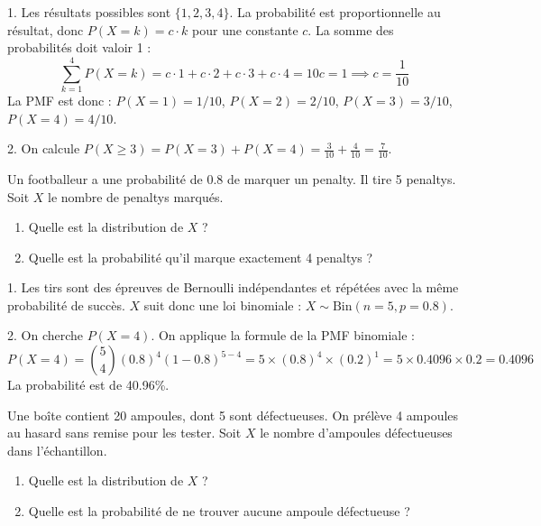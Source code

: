 \begin{correctionbox}
1. Les résultats possibles sont $\{1, 2, 3, 4\}$. La probabilité est proportionnelle au résultat, donc $P(X=k) = c \cdot k$ pour une constante $c$.
La somme des probabilités doit valoir 1 :
$$ \sum_{k=1}^{4} P(X=k) = c \cdot 1 + c \cdot 2 + c \cdot 3 + c \cdot 4 = 10c = 1 \implies c = \frac{1}{10} $$
La PMF est donc : $P(X=1)=1/10$, $P(X=2)=2/10$, $P(X=3)=3/10$, $P(X=4)=4/10$.

2. On calcule $P(X \ge 3) = P(X=3) + P(X=4) = \frac{3}{10} + \frac{4}{10} = \frac{7}{10}$.
\end{correctionbox}

\begin{exercicebox}
Un footballeur a une probabilité de $0.8$ de marquer un penalty. Il tire 5 penaltys. Soit $X$ le nombre de penaltys marqués.
\begin{enumerate}
    \item Quelle est la distribution de $X$ ?
    \item Quelle est la probabilité qu'il marque exactement 4 penaltys ?
\end{enumerate}
\end{exercicebox}

\begin{correctionbox}
1. Les tirs sont des épreuves de Bernoulli indépendantes et répétées avec la même probabilité de succès. $X$ suit donc une loi binomiale : $X \sim \text{Bin}(n=5, p=0.8)$.

2. On cherche $P(X=4)$. On applique la formule de la PMF binomiale :
$$ P(X=4) = \binom{5}{4} (0.8)^4 (1-0.8)^{5-4} = 5 \times (0.8)^4 \times (0.2)^1 = 5 \times 0.4096 \times 0.2 = 0.4096 $$
La probabilité est de 40.96\%.
\end{correctionbox}

\begin{exercicebox}
Une boîte contient 20 ampoules, dont 5 sont défectueuses. On prélève 4 ampoules au hasard sans remise pour les tester. Soit $X$ le nombre d'ampoules défectueuses dans l'échantillon.
\begin{enumerate}
    \item Quelle est la distribution de $X$ ?
    \item Quelle est la probabilité de ne trouver aucune ampoule défectueuse ?
\end{enumerate}
\end{exercicebox}

